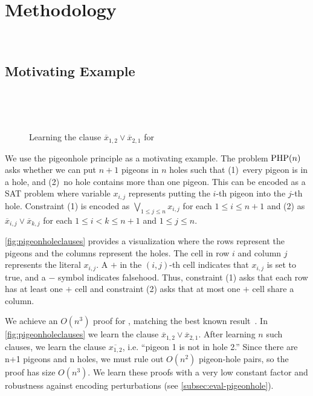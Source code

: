 \section{Methodology}~\label{sec:method}

\subsection{Motivating Example}~\label{sec:motivatex}

\begin{figure*}[!t]
    \centering
    
    \caption{Learning the clause $\overline{x}_{1, 2} \lor \overline{x}_{2, 1}$
    for }~\label{fig:pigeonholeclauses}
  \end{figure*}

We use the pigeonhole principle as a motivating example. The problem $\mathrm{PHP}(n)$
asks whether we can put $n+1$ pigeons in $n$ holes such that (1)~every pigeon is
in a hole, and (2)~no hole contains more than one pigeon. This can be encoded as
a SAT problem where variable $x_{i, j}$ represents putting the $i$-th pigeon
into the $j$-th hole. Constraint (1) is encoded as $\bigvee_{1 \leq j \leq n}
x_{i, j}$ for each $1 \leq i \leq n+1$ and (2) as $\overline{x}_{i, j} \lor
\overline{x}_{k, j}$ for each $ 1 \leq i < k \leq n+1$ and $1 \leq j \leq n$.

\autoref{fig:pigeonholeclauses} provides a visualization where the rows
represent the pigeons and the columns represent the holes. The cell in row $i$
and column $j$ represents the literal $x_{i, j}$.
A $+$ in the $(i, j)$-th cell indicates that $x_{i, j}$ is set to true, and a
$-$ symbol indicates falsehood. Thus, constraint (1) asks that each row has at
least one $+$ cell and constraint (2) asks that at most one $+$ cell share a
column.

We achieve an $O(n^3)$ \pr proof for , matching the best known
result~\cite{prclauses}. In \autoref{fig:pigeonholeclauses} we learn the clause
$\overline{x}_{1, 2} \lor \overline{x}_{2, 1}$. After learning $n$ such clauses,
we learn the clause $\overline{x_{1, 2}}$, i.e. “pigeon 1 is not in hole 2.”
Since there are n+1 pigeons and n holes, we must rule out $O(n^2)$ pigeon-hole
pairs, so the proof has size $O(n^3)$. We learn these proofs with a very low
constant factor and robustness against encoding perturbations (see
\autoref{subsec:eval-pigeonhole}).

